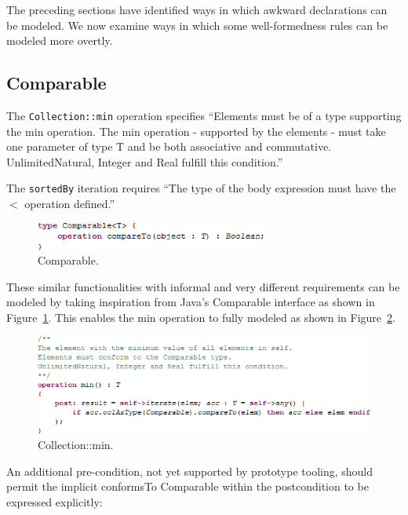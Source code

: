 \documentclass{eceasst}
\begin{document}
The preceding sections have identified ways in which awkward declarations can be modeled. We now examine ways in which some well-formedness rules can be modeled more overtly.

\subsection{Comparable}

The \verb|Collection::min| operation specifies ``Elements must be of a type supporting the min operation. The min operation - supported by the elements - must take one parameter of type T and be both associative and commutative. UnlimitedNatural, Integer and Real fulfill this condition.''

The \verb|sortedBy| iteration requires ``The type of the body expression must have the $<$ operation defined.''

\begin{figure}
  \begin{center}
    \includegraphics[width=3.0in]{Comparable.png}
  \end{center}
  \caption{Comparable.}
  \label{fig:Comparable}
\end{figure}

These similar functionalities with informal and very different requirements can be modeled by taking inspiration from Java's Comparable interface as shown in Figure~\ref{fig:Comparable}. This enables the min operation to fully modeled as shown in Figure~\ref{fig:Collection_min}.

\begin{figure}
  \begin{center}
    \includegraphics[width=5.0in]{Collection_min.png}
  \end{center}
  \caption{Collection::min.}
  \label{fig:Collection_min}
\end{figure}

An additional pre-condition, not yet supported by prototype tooling, should permit the implicit conformsTo Comparable within the postcondition to be expressed explicitly:
\end{document}
